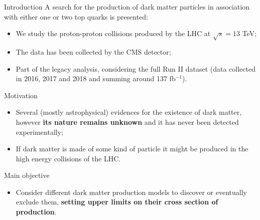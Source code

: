 \documentclass[8pt]{beamer}
\begin{document}
\begin{frame}{Introduction}
\justifying
A search for the \alert{production of dark matter particles in association with either one or two top quarks} is presented:

\vspace{-5pt}
\begin{itemize}
\justifying
\item We study the proton-proton collisions produced by the LHC at $\sqrt{s} = 13$ TeV;
\item The data has been collected by the CMS detector;
\item Part of the legacy analysis, considering the full Run II dataset (data collected in 2016, 2017 and 2018 and summing around 137 fb$^{-1}$).
\end{itemize} \vfill

\begin{block}{\centering Motivation}\end{block}
\vspace{-5pt}
\begin{itemize}
\justifying
\item Several (mostly astrophysical) evidences for the existence of dark matter, however \textbf{its nature remains unknown} and it has never been detected experimentally;
\item If dark matter is made of some kind of particle it might be produced in the high energy collisions of the LHC.
\end{itemize} \vfill

\begin{block}{ \centering Main objective}\end{block}
\vspace{-5pt}
\begin{itemize}
\justifying
\item Consider different dark matter production models to discover or eventually exclude them, \textbf{setting upper limits on their cross section of production}.
\end{itemize} \vfill
\end{frame}
\end{document}
